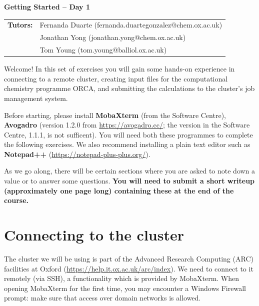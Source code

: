 \documentclass[10pt]{article}
\begin{document}
\textbf{\LARGE Getting Started -- Day 1}

\vspace{0.2cm}

\begin{tabular}{ll} %
    \textbf{Tutors:} & Fernanda Duarte (fernanda.duartegonzalez@chem.ox.ac.uk) \\
     & Jonathan Yong (jonathan.yong@chem.ox.ac.uk) \\
     & Tom Young (tom.young@balliol.ox.ac.uk)
\end{tabular}

\vspace{0.2cm}

Welcome! In this set of exercises you will gain some hands-on experience in connecting to a remote cluster, creating input files for the computational chemistry programme ORCA, and submitting the calculations to the cluster's job management system. 

Before starting, please install \textbf{MobaXterm} (from the Software Centre), \textbf{Avogadro} (version 1.2.0 from \url{https://avogadro.cc/}; the version in the Software Centre, 1.1.1, is not sufficent). You will need both these programmes to complete the following exercises. We also recommend installing a plain text editor such as \textbf{Notepad++} (\url{https://notepad-plus-plus.org/}).

As we go along, there will be certain sections where you are asked to note down a value or to answer some questions. \textbf{You will need to submit a short writeup (approximately one page long) containing these at the end of the course.}

\section{Connecting to the cluster}

The cluster we will be using is part of the Advanced Research Computing (ARC) facilities at Oxford (\url{https://help.it.ox.ac.uk/arc/index}). We need to connect to it remotely (via SSH), a functionality which is provided by MobaXterm. When opening MobaXterm for the first time, you may encounter a Windows Firewall prompt: make sure that access over domain networks is allowed.
\end{document}
